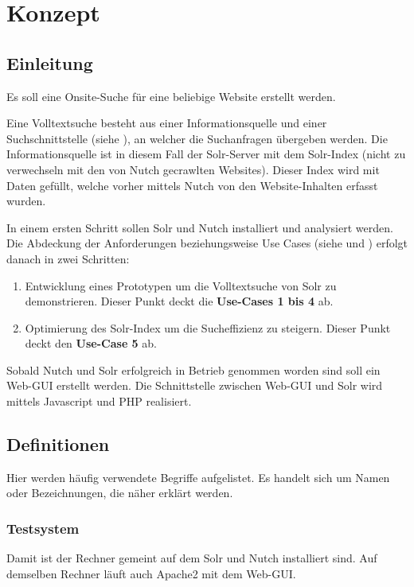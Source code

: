 
\cleardoublepage\chapter{Konzept}\label{chap:Konzept}
\section{Einleitung}
Es soll eine Onsite-Suche für eine beliebige Website erstellt werden.

Eine Volltextsuche besteht aus einer Informationsquelle und einer Suchschnittstelle (siehe ), an welcher die Suchanfragen übergeben werden. Die Informationsquelle ist in diesem Fall der Solr-Server mit dem Solr-Index (nicht zu verwechseln mit den von Nutch gecrawlten Websites). Dieser Index wird mit Daten gefüllt, welche vorher mittels Nutch von den Website-Inhalten erfasst wurden.

In einem ersten Schritt sollen Solr und Nutch installiert und analysiert werden. Die Abdeckung der Anforderungen beziehungsweise Use Cases (siehe  und ) erfolgt danach in zwei Schritten:
\begin{enumerate}
\item Entwicklung eines Prototypen um die Volltextsuche von Solr zu demonstrieren. Dieser Punkt deckt die \textbf{Use-Cases 1 bis 4} ab.
\item Optimierung des Solr-Index um die Sucheffizienz zu steigern. Dieser Punkt deckt den \textbf{Use-Case 5} ab.
\end{enumerate}

Sobald Nutch und Solr erfolgreich in Betrieb genommen worden sind soll ein Web-GUI erstellt werden. Die Schnittstelle zwischen Web-GUI und Solr wird mittels Javascript und PHP realisiert.

\section{Definitionen}
Hier werden häufig verwendete Begriffe aufgelistet. Es handelt sich um Namen oder Bezeichnungen, die näher erklärt werden.

\subsection*{Testsystem}
Damit ist der Rechner gemeint auf dem Solr und Nutch installiert sind. Auf demselben Rechner läuft auch Apache2 mit dem Web-GUI.

